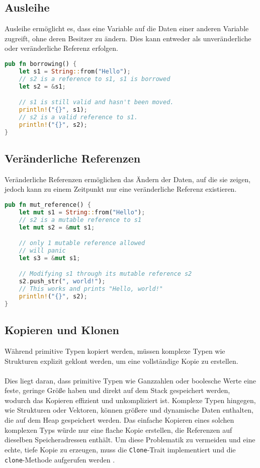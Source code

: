 \subsection{Ausleihe}
Ausleihe ermöglicht es, dass eine Variable auf die Daten einer anderen Variable zugreift, ohne deren Besitzer zu ändern. Dies kann entweder als unveränderliche oder veränderliche Referenz erfolgen.

\begin{lstlisting}[language=Rust, caption=Unveränderliche Ausleihe]
pub fn borrowing() {
    let s1 = String::from("Hello");
    // s2 is a reference to s1, s1 is borrowed
    let s2 = &s1;  

    // s1 is still valid and hasn't been moved.
    println!("{}", s1); 
    // s2 is a valid reference to s1.
    println!("{}", s2); 
}
\end{lstlisting}

\subsection{Veränderliche Referenzen}
Veränderliche Referenzen ermöglichen das Ändern der Daten, auf die sie zeigen, jedoch kann zu einem Zeitpunkt nur eine veränderliche Referenz existieren.

\begin{lstlisting}[language=Rust, caption=Veränderliche Referenz]
pub fn mut_reference() {
    let mut s1 = String::from("Hello");
    // s2 is a mutable reference to s1
    let mut s2 = &mut s1;  

    // only 1 mutable reference allowed
    // will panic
    let s3 = &mut s1;

    // Modifying s1 through its mutable reference s2
    s2.push_str(", world!"); 
    // This works and prints "Hello, world!"
    println!("{}", s2); 
}
\end{lstlisting}
\cleardoublepage
\subsection{Kopieren und Klonen}
Während primitive Typen kopiert werden, müssen komplexe Typen wie Strukturen explizit geklont werden, um eine vollständige Kopie zu erstellen.\\
\\
Dies liegt daran, dass primitive Typen wie Ganzzahlen oder boolesche Werte eine feste, geringe Größe haben und direkt auf dem Stack gespeichert werden, wodurch das Kopieren effizient und unkompliziert ist. 
Komplexe Typen hingegen, wie Strukturen oder Vektoren, können größere und dynamische Daten enthalten, die auf dem Heap gespeichert werden. 
Das einfache Kopieren eines solchen komplexen Typs würde nur eine flache Kopie erstellen, die Referenzen auf dieselben Speicheradressen enthält. 
Um diese Problematik zu vermeiden und eine echte, tiefe Kopie zu erzeugen, muss die \texttt{Clone}-Trait implementiert und die \texttt{clone}-Methode aufgerufen werden \cite{rust_clone} \cite{feltzman2023}.

